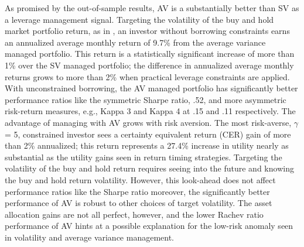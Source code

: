 As promised by the out-of-sample results, AV is a substantially better than SV as a leverage management signal. Targeting the volatility of the buy and hold market portfolio return, as in \citet{moreira_volatility-managed_2017}, an investor without borrowing constraints earns an annualized average monthly return of 9.7\% from the average variance managed portfolio. This return is a statistically significant increase of more than 1\% over the SV managed portfolio; the difference in annualized average monthly returns grows to more than 2\% when practical leverage constraints are applied. With unconstrained borrowing, the AV managed portfolio has significantly better performance ratios like the symmetric Sharpe ratio, .52, and more asymmetric risk-return measures, e.g., Kappa 3 and Kappa 4 at .15 and .11 respectively. The advantage of managing with AV grows with risk aversion. The most risk-averse, $\gamma$ = 5, constrained investor sees a certainty equivalent return (CER) gain of more than 2\% annualized; this return represents a 27.4\% increase in utility nearly as substantial as the utility gains seen in return timing strategies. \citep{campbell1997econometrics} Targeting the volatility of the buy and hold return requires seeing into the future and knowing the buy and hold return volatility. However, this look-ahead does not affect performance ratios like the Sharpe ratio moreover, the significantly better performance of AV is robust to other choices of target volatility. The asset allocation gains are not all perfect, however, and the lower Rachev ratio performance of AV hints at a possible explanation for the low-risk anomaly seen in volatility and average variance management. 

